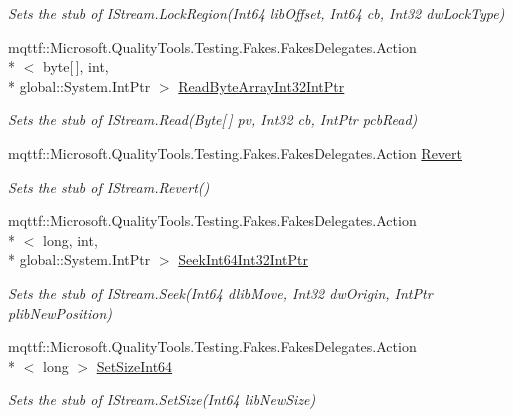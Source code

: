 \begin{DoxyCompactItemize}
\begin{DoxyCompactList}\small\item\em Sets the stub of I\-Stream.\-Lock\-Region(\-Int64 lib\-Offset, Int64 cb, Int32 dw\-Lock\-Type)\end{DoxyCompactList}\item 
mqttf\-::\-Microsoft.\-Quality\-Tools.\-Testing.\-Fakes.\-Fakes\-Delegates.\-Action\\*
$<$ byte\mbox{[}$\,$\mbox{]}, int, \\*
global\-::\-System.\-Int\-Ptr $>$ \hyperlink{class_system_1_1_runtime_1_1_interop_services_1_1_com_types_1_1_fakes_1_1_stub_i_stream_ac75b948ce5d47ffd4ccf9ce5a74eb9ba}{Read\-Byte\-Array\-Int32\-Int\-Ptr}
\begin{DoxyCompactList}\small\item\em Sets the stub of I\-Stream.\-Read(\-Byte\mbox{[}$\,$\mbox{]} pv, Int32 cb, Int\-Ptr pcb\-Read)\end{DoxyCompactList}\item 
mqttf\-::\-Microsoft.\-Quality\-Tools.\-Testing.\-Fakes.\-Fakes\-Delegates.\-Action \hyperlink{class_system_1_1_runtime_1_1_interop_services_1_1_com_types_1_1_fakes_1_1_stub_i_stream_a4b5e86216333227680d0744b010f0306}{Revert}
\begin{DoxyCompactList}\small\item\em Sets the stub of I\-Stream.\-Revert()\end{DoxyCompactList}\item 
mqttf\-::\-Microsoft.\-Quality\-Tools.\-Testing.\-Fakes.\-Fakes\-Delegates.\-Action\\*
$<$ long, int, \\*
global\-::\-System.\-Int\-Ptr $>$ \hyperlink{class_system_1_1_runtime_1_1_interop_services_1_1_com_types_1_1_fakes_1_1_stub_i_stream_ab29c4e1e0ce905f9d140f3c13887a35b}{Seek\-Int64\-Int32\-Int\-Ptr}
\begin{DoxyCompactList}\small\item\em Sets the stub of I\-Stream.\-Seek(\-Int64 dlib\-Move, Int32 dw\-Origin, Int\-Ptr plib\-New\-Position)\end{DoxyCompactList}\item 
mqttf\-::\-Microsoft.\-Quality\-Tools.\-Testing.\-Fakes.\-Fakes\-Delegates.\-Action\\*
$<$ long $>$ \hyperlink{class_system_1_1_runtime_1_1_interop_services_1_1_com_types_1_1_fakes_1_1_stub_i_stream_a4c059f3cf2b77be257f79df936ed4b0b}{Set\-Size\-Int64}
\begin{DoxyCompactList}\small\item\em Sets the stub of I\-Stream.\-Set\-Size(\-Int64 lib\-New\-Size)\end{DoxyCompactList}\item 

\end{DoxyCompactItemize}
